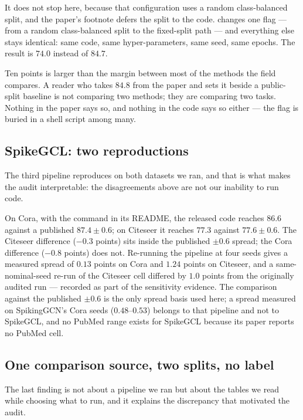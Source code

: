 It does not stop here, because that configuration uses a random class-balanced split, and the paper's
footnote defers the split to the code.  changes one flag --- from a random
class-balanced split to the fixed-split path --- and everything else stays identical: same code, same
hyper-parameters, same seed, same epochs. The result is $74.0$ instead of $84.7$.

Ten points is larger than the margin between most of the methods the field compares. A reader who
takes $84.8$ from the paper and sets it beside a public-split baseline is not comparing two methods;
they are comparing two tasks. Nothing in the paper says so, and nothing in the code says so either
--- the flag is buried in a shell script among many.

\subsection{SpikeGCL: two reproductions}
\label{sec:gcl}

The third pipeline reproduces on both datasets we ran, and that is what makes the audit
interpretable: the disagreements above are not our inability to run code.

On Cora, with the command in its README, the released code reaches $86.6$ against a published
$87.4\pm0.6$; on Citeseer it reaches $77.3$ against $77.6\pm0.6$. The Citeseer difference
($-0.3$ points) sits inside the published $\pm 0.6$ spread; the Cora difference ($-0.8$ points)
does not. Re-running the pipeline at four seeds gives a measured spread of $0.13$ points on Cora
and $1.24$ points on Citeseer, and a same-nominal-seed re-run of the Citeseer cell differed by
$1.0$ points from the originally audited run --- recorded as part of the sensitivity evidence.
The comparison against the published $\pm 0.6$ is the only spread
basis used here; a spread measured on SpikingGCN's Cora seeds ($0.48$--$0.53$) belongs to that
pipeline and not to SpikeGCL, and no PubMed range exists for SpikeGCL because its paper reports no
PubMed cell.

\subsection{One comparison source, two splits, no label}
\label{sec:mixed}

The last finding is not about a pipeline we ran but about the tables we read while choosing what to
run, and it explains the discrepancy that motivated the audit.

